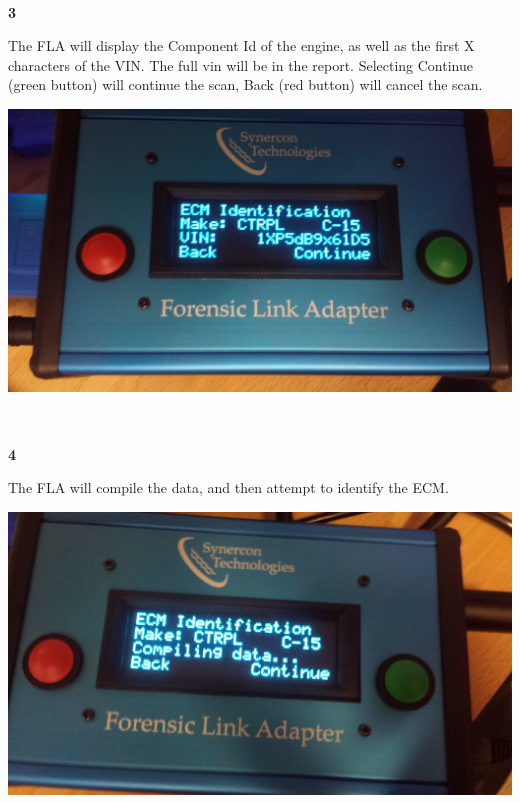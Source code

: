 \documentclass[11pt]{article}
\begin{document}
\\[\baselineskip]
\noindent\begin{minipage}{0.3\textwidth}%
\begin{center}
\textbf{3}\\[\baselineskip]
\end{center}
The FLA will display the Component Id of the engine, as well as the first X characters of the VIN. The full vin will be in the report. Selecting Continue (green button) will continue the scan, Back (red button) will cancel the scan.
\end{minipage}%
\hfill%
\begin{minipage}{0.6\textwidth}
\includegraphics[width=\linewidth]{../media/fla_screens/comp_id}
\end{minipage}
\\[\baselineskip]
\noindent\begin{minipage}{0.3\textwidth}%
\begin{center}
\textbf{4}\\[\baselineskip]
\end{center}
The FLA will compile the data, and then attempt to identify the ECM.
\end{minipage}%
\hfill%
\begin{minipage}{0.6\textwidth}
\includegraphics[width=\linewidth]{../media/fla_screens/comp_id_compile}
\end{minipage}
\end{document}
